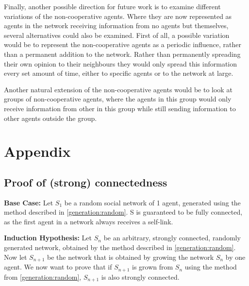 \documentclass{article}
\begin{document}
\noindent Finally, another possible direction for future work is to examine different variations of the non-cooperative agents. Where they are now represented as agents in the network receiving information from no agents but themselves, several alternatives could also be examined. First of all, a possible variation would be to represent the non-cooperative agents as a periodic influence, rather than a permanent addition to the network. Rather than permanently spreading their own opinion to their neighbours they would only spread this information every set amount of time, either to specific agents or to the network at large. 

\noindent Another natural extension of the non-cooperative agents would be to look at groups of non-cooperative agents, where the agents in this group would only receive information from other in this group while still sending information to other agents outside the group.

\newpage

\printbibliography

\newpage

\section{Appendix}
\subsection{Proof of (strong) connectedness}
\label{proof:conn}
\textbf{Base Case:} \newline
Let $S_1$ be a random social network of 1 agent, generated using the method described in \ref{generation:random}.
S is guaranteed to be fully connected, as the first agent in a network always receives a self-link.\newline

\textbf{Induction Hypothesis:}\newline
Let $S_n$ be an arbitrary, strongly connected, randomly generated network, obtained by the method described in \ref{generation:random}. Now let $S_{n+1}$ be the network that is obtained by growing the network $S_n$ by one agent. We now want to prove that if $S_{n+1}$ is grown from $S_n$ using the method from \ref{generation:random}, $S_{n+1}$ is also strongly connected.\newline
\end{document}

